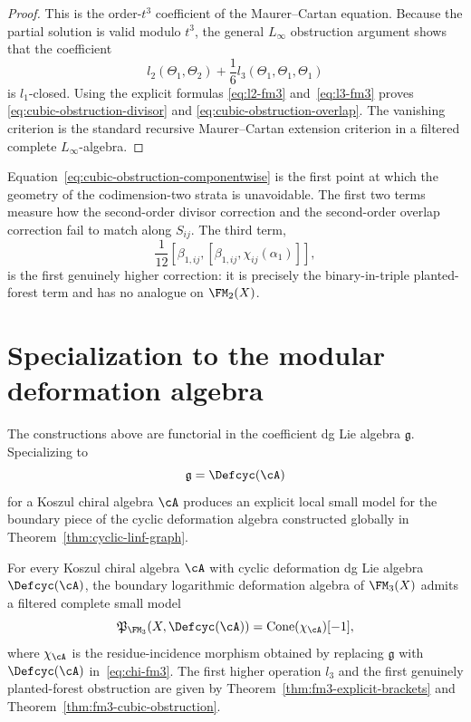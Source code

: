\begin{proof}
This is the order-$t^3$ coefficient of the Maurer--Cartan equation.  Because the
partial solution is valid modulo $t^3$, the general $L_\infty$ obstruction
argument shows that the coefficient
\[
 l_2(\Theta_1,\Theta_2) + \frac16 l_3(\Theta_1,\Theta_1,\Theta_1)
\]
is $l_1$-closed.  Using the explicit formulas
\eqref{eq:l2-fm3} and~\eqref{eq:l3-fm3} proves
\eqref{eq:cubic-obstruction-divisor} and
\eqref{eq:cubic-obstruction-overlap}.  The vanishing criterion is the standard
recursive Maurer--Cartan extension criterion in a filtered complete
$L_\infty$-algebra.
\end{proof}

\begin{remark}
Equation~\eqref{eq:cubic-obstruction-componentwise} is the first point at which
the geometry of the codimension-two strata is unavoidable.  The first two terms
measure how the second-order divisor correction and the second-order overlap
correction fail to match along $S_{ij}$.  The third term,
\[
\frac1{12}[\beta_{1,ij},[\beta_{1,ij},\chi_{ij}(\alpha_1)]],
\]
is the first genuinely higher correction: it is precisely the binary-in-triple
planted-forest term and has no analogue on $\FM_2(X)$.
\end{remark}

\section{Specialization to the modular deformation algebra}
\label{sec:fm3-specialization-defcyc}

The constructions above are functorial in the coefficient dg Lie algebra
$\mathfrak g$.  Specializing to
\[
\mathfrak g = \Defcyc(\cA)
\]
for a Koszul chiral algebra $\cA$ produces an explicit local small model for the
boundary piece of the cyclic deformation algebra constructed globally in
Theorem~\ref{thm:cyclic-linf-graph}.

\begin{corollary}
\label{cor:fm3-defcyc-specialization}
For every Koszul chiral algebra $\cA$ with cyclic deformation dg Lie algebra
$\Defcyc(\cA)$, the boundary logarithmic deformation algebra of
$\FM_3(X)$ admits a filtered complete small model
\[
\mathfrak P_{\FM_3}(X,\Defcyc(\cA))
=
\operatorname{Cone}(\chi_{\cA})[-1],
\]
where $\chi_{\cA}$ is the residue-incidence morphism obtained by replacing
$\mathfrak g$ with $\Defcyc(\cA)$ in~\eqref{eq:chi-fm3}.  The first higher
operation $l_3$ and the first genuinely planted-forest obstruction are given by
Theorem~\ref{thm:fm3-explicit-brackets} and
Theorem~\ref{thm:fm3-cubic-obstruction}.
\end{corollary}

